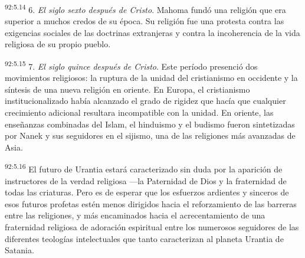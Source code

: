 \documentclass[twoside, 11pt]{book}
\begin{document}
\par
\textsuperscript{92:5.14} 6. \textit{El siglo sexto después de Cristo}. Mahoma fundó una religión que era superior a muchos credos de su época. Su religión fue una protesta contra las exigencias sociales de las doctrinas extranjeras y contra la incoherencia de la vida religiosa de su propio pueblo.

\par
\textsuperscript{92:5.15} 7. \textit{El siglo quince después de Cristo}. Este período presenció dos movimientos religiosos: la ruptura de la unidad del cristianismo en occidente y la síntesis de una nueva religión en oriente. En Europa, el cristianismo institucionalizado había alcanzado el grado de rigidez que hacía que cualquier crecimiento adicional resultara incompatible con la unidad. En oriente, las enseñanzas combinadas del Islam, el hinduismo y el budismo fueron sintetizadas por Nanek y sus seguidores en el sijismo, una de las religiones más avanzadas de Asia.

\par
\textsuperscript{92:5.16} El futuro de Urantia estará caracterizado sin duda por la aparición de instructores de la verdad religiosa ---la Paternidad de Dios y la fraternidad de todas las criaturas. Pero es de esperar que los esfuerzos ardientes y sinceros de esos futuros profetas estén menos dirigidos hacia el reforzamiento de las barreras entre las religiones, y más encaminados hacia el acrecentamiento de una fraternidad religiosa de adoración espiritual entre los numerosos seguidores de las diferentes teologías intelectuales que tanto caracterizan al planeta Urantia de Satania.
\end{document}
